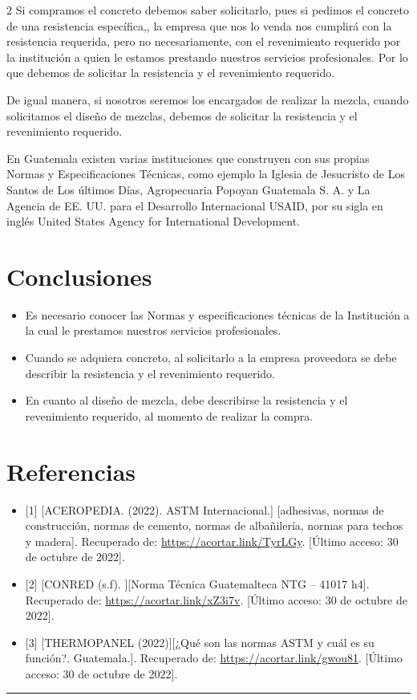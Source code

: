\documentclass[12pt,spanish,Letterpaper,openany]{book}
\newcommand{\HRule}{\begin{center}\rule{0.5\linewidth}{0.2mm}\end{center}}
\begin{document}
\begin {multicols}{2}
Si compramos el concreto debemos saber solicitarlo, pues si pedimos el concreto de una resistencia específica,, la empresa que nos lo venda nos cumplirá con la resistencia requerida, pero no necesariamente, con el revenimiento requerido por la institución a quien le estamos prestando nuestros servicios profesionales. Por lo que debemos de solicitar la resistencia y el revenimiento requerido.

De igual manera, si nosotros seremos los encargados de realizar la mezcla, cuando solicitamos el diseño de mezclas, debemos de solicitar la resistencia y el revenimiento requerido.

En Guatemala existen varias instituciones que construyen con sus propias Normas y Especificaciones Técnicas, como ejemplo la Iglesia de Jesucristo de Los Santos de Los últimos Días, Agropecuaria Popoyan Guatemala S. A. y La Agencia de EE. UU. para el Desarrollo Internacional USAID, por su sigla en inglés United States Agency for International Development.

\hypertarget{conclusiones-10}{%
\section{Conclusiones}\label{conclusiones-10}}

\begin{itemize}
\item
  Es necesario conocer las Normas y especificaciones técnicas de la Institución a la cual le prestamos nuestros servicios profesionales.
\item
  Cuando se adquiera concreto, al solicitarlo a la empresa proveedora se debe describir la resistencia y el revenimiento requerido.
\item
  En cuanto al diseño de mezcla, debe describirse la resistencia y el revenimiento requerido, al momento de realizar la compra.
\end{itemize}

\hypertarget{referencias-10}{%
\section{Referencias}\label{referencias-10}}

\begin{itemize}
\item
  {[}1{]} {[}ACEROPEDIA. (2022). ASTM Internacional.{]} {[}adhesivas, normas de construcción, normas de cemento, normas de albañilería, normas para techos y madera{]}. Recuperado de: \url{https://acortar.link/TyrLGy}. {[}Último acceso: 30 de octubre de 2022{]}.
\item
  {[}2{]} {[}CONRED (s.f). {]}{[}Norma Técnica Guatemalteca NTG -- 41017 h4{]}. Recuperado de: \url{https://acortar.link/xZ3i7v}. {[}Último acceso: 30 de octubre de 2022{]}.
\item
  {[}3{]} {[}THERMOPANEL (2022){]}{[}¿Qué son las normas ASTM y cuál es su función?. Guatemala.{]}. Recuperado de: \url{https://acortar.link/gwou81}. {[}Último acceso: 30 de octubre de 2022{]}.
\end{itemize}

\end {multicols}
\medskip
\HRule
\medskip







\end{document}
